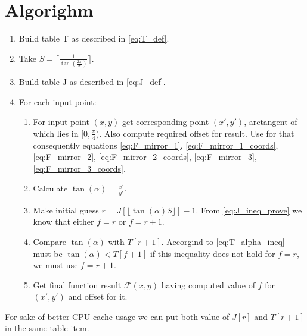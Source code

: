 \documentclass{article}
\begin{document}
\section{Algorighm}
\begin{enumerate}
\item Build table T as described in \eqref{eq:T_def}.
\item Take $S = \lceil \frac{1}{\tan(\frac{2\pi}{N})} \rceil$.
\item Build table J as described in \eqref{eq:J_def}.
\item For each input point:
\begin{enumerate}
\item For input point $(x, y)$ get corresponding point $(x', y')$, arctangent of
      which lies in $[0, \frac{\pi}{4})$. Also compute required offset for result.
      Use for that consequently equations
      \eqref{eq:F_mirror_1}, \eqref{eq:F_mirror_1_coords},
      \eqref{eq:F_mirror_2}, \eqref{eq:F_mirror_2_coords},
      \eqref{eq:F_mirror_3}, \eqref{eq:F_mirror_3_coords}.
\item Calculate $\tan(\alpha) = \frac{x'}{y'}.$
\item Make initial guess $r = J[\lfloor \tan(\alpha)S \rfloor] - 1$. From
    \eqref{eq:J_ineq_prove} we know that either $f = r$ or $f = r + 1$.
\item Compare $\tan(\alpha)$ with $T[r + 1]$. Accorgind to \eqref{eq:T_alpha_ineq}
    must be $\tan(\alpha) < T[f + 1]$ if this inequality does not hold for $f = r$, we
    must use $f = r + 1$.
\item Get final function result $\mathcal{F}(x, y)$ having computed value of
$f$ for $(x', y')$ and offset for it.
\end{enumerate}
\end{enumerate}
For sake of better CPU cache usage we can put both value of $J[r]$ and $T[r + 1]$
in the same table item.
\end{document}
